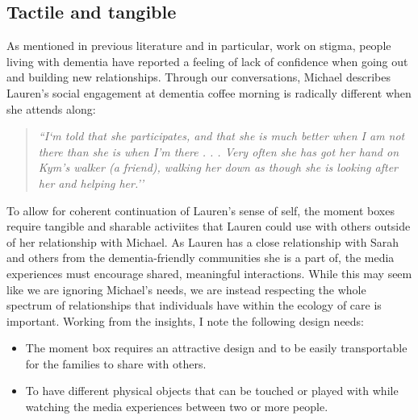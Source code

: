 \subsection{Tactile and tangible}
\label{DR:TactileTangible}
As mentioned in previous literature and in particular, \cite{nolan_perceptions_2006} work on stigma, people living with dementia have reported a feeling of lack of confidence when going out and building new relationships. Through our conversations, Michael describes Lauren's social engagement at dementia coffee morning is radically different when she attends along:

\begin{quote}
\textit{    ``I`m told that she participates, and that she is much better when I am not there than she is when I’m there . . . Very often she has got her hand on Kym’s walker (a friend), walking her down as though she is looking after her and helping her.''
}
\end{quote}

To allow for coherent continuation of Lauren’s sense of self, the moment boxes require tangible and sharable activiites that Lauren could use with others outside of her relationship with Michael. As Lauren has a close relationship with Sarah and others from the dementia-friendly communities she is a part of, the media experiences must encourage shared, meaningful interactions. While this may seem like we are ignoring Michael’s needs, we are instead respecting the whole spectrum of relationships that individuals have within the ecology of care is important. Working from the insights, I note the following design needs:
\begin{itemize}
    \item The moment box requires an attractive design and to be easily transportable for the families to share with others.
    \item To have different physical objects that can be touched or played with while watching the media experiences between two or more people. 
\end{itemize}

